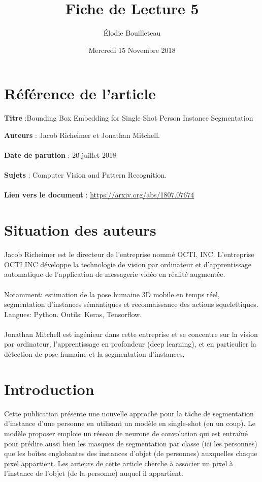 \documentclass[11pt]{report}
\title{Fiche de Lecture 5}
\author{Élodie Bouilleteau}
\date{Mercredi 15 Novembre 2018}
\begin{document}
\maketitle
\renewcommand{\thesection}{\arabic{section}} 

\section{Référence de l'article}
	\begin{flushleft}
		\textbf{Titre} :Bounding Box Embedding for Single Shot Person Instance Segmentation
	\end{flushleft}
	\textbf{Auteurs} : Jacob Richeimer et Jonathan Mitchell.\\\\
	\textbf{Date de parution} : 20 juillet 2018\\\\
	\textbf{Sujets} : Computer Vision and Pattern Recognition.\\\\
	\textbf{Lien vers le document} : \url{https://arxiv.org/abs/1807.07674}
	
\section{Situation des auteurs}
Jacob Richeimer est le directeur de l'entreprise nommé OCTI, INC. L'entreprise OCTI INC développe la technologie de vision par ordinateur et d'apprentissage automatique de l'application de messagerie vidéo en réalité augmentée.\\\\
Notamment: estimation de la pose humaine 3D mobile en temps réel, segmentation d'instances sémantiques et reconnaissance des actions squelettiques. Langues: Python. Outils: Keras, Tensorflow.\\\\
Jonathan Mitchell est ingénieur dans cette entreprise et se concentre sur la vision par ordinateur, l'apprentissage en profondeur (deep learning), et en particulier la détection de pose humaine et la segmentation d'instances.

\section{Introduction}
Cette publication présente une nouvelle approche pour la tâche de segmentation d'instance d'une personne en utilisant un modèle en single-shot (en un coup). Le modèle proposer emploie un réseau de neurone de convolution qui est entraîné pour prédire aussi bien les masques de segmentation par classe (ici les personnes) que les boîtes englobantes des instances d'objet (de personnes) auxquelles chaque pixel appartient. Les auteurs de cette article cherche à associer un pixel à l'instance de l'objet (de la personne) auquel il appartient.
\end{document}
